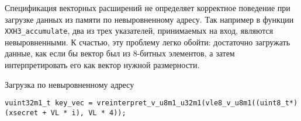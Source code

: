Спецификация векторных расширений \riscv{} не определяет корректное поведение при загрузке данных из памяти по невыровненному адресу.
Так например в функции \texttt{XXH3\_accumulate}, два из трех указателей, принимаемых на вход, являются невыровненными.
К счастью, эту проблему легко обойти: достаточно загружать данные, как если бы вектор был из 8-битных элементов, а затем интерпретировать его как вектор нужной размерности.
\begin{listing}
	\caption{Загрузка по невыровненному адресу}
	\begin{verbatim}
vuint32m1_t key_vec = vreinterpret_v_u8m1_u32m1(vle8_v_u8m1((uint8_t*)(xsecret + VL * i), VL * 4));
	\end{verbatim}
\end{listing}
